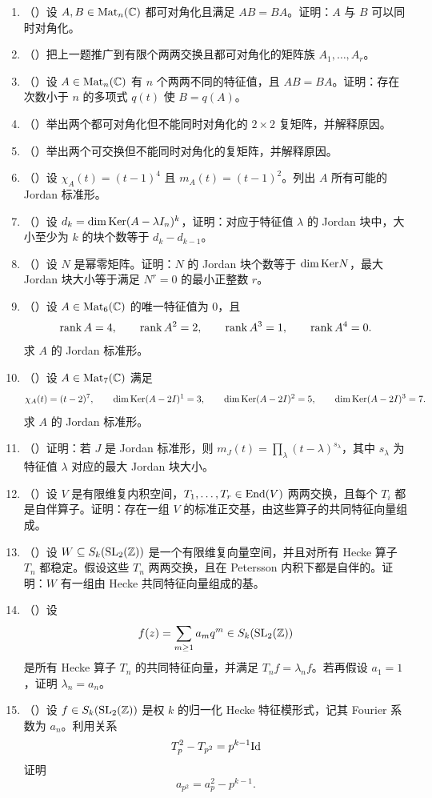 \begin{enumerate}[label=\arabic*., leftmargin=2.8em, resume]
  \item （\hard）设 \(A,B\in \mathrm{Mat}_n(\mathbb{C})\) 都可对角化且满足 \(AB=BA\)。证明：\(A\) 与 \(B\) 可以同时对角化。
  \item （\hard）把上一题推广到有限个两两交换且都可对角化的矩阵族 \(A_1,\dots,A_r\)。
  \item （\hard）设 \(A\in \mathrm{Mat}_n(\mathbb{C})\) 有 \(n\) 个两两不同的特征值，且 \(AB=BA\)。证明：存在次数小于 \(n\) 的多项式 \(q(t)\) 使 \(B=q(A)\)。
  \item （\hard）举出两个都可对角化但不能同时对角化的 \(2\times 2\) 复矩阵，并解释原因。
  \item （\hard）举出两个可交换但不能同时对角化的复矩阵，并解释原因。
  \item （\hard）设 \(\chi_A(t)=(t-1)^4\) 且 \(m_A(t)=(t-1)^2\)。列出 \(A\) 所有可能的 Jordan 标准形。
  \item （\hard）设 \(d_k=\dim\mathrm{Ker}(A-\lambda I_n)^k\)，证明：对应于特征值 \(\lambda\) 的 Jordan 块中，大小至少为 \(k\) 的块个数等于 \(d_k-d_{k-1}\)。
  \item （\hard）设 \(N\) 是幂零矩阵。证明：\(N\) 的 Jordan 块个数等于 \(\dim\mathrm{Ker} N\)，最大 Jordan 块大小等于满足 \(N^r=0\) 的最小正整数 \(r\)。
  \item （\hard）设 \(A\in \mathrm{Mat}_6(\mathbb{C})\) 的唯一特征值为 \(0\)，且
  \[
  \operatorname{rank} A=4,\qquad \operatorname{rank} A^2=2,\qquad \operatorname{rank} A^3=1,\qquad \operatorname{rank} A^4=0.
  \]
  求 \(A\) 的 Jordan 标准形。
  \item （\hard）设 \(A\in \mathrm{Mat}_7(\mathbb{C})\) 满足
  \[
  \chi_A(t)=(t-2)^7,
  \qquad \dim\mathrm{Ker}(A-2I)^1=3,
  \qquad \dim\mathrm{Ker}(A-2I)^2=5,
  \qquad \dim\mathrm{Ker}(A-2I)^3=7.
  \]
  求 \(A\) 的 Jordan 标准形。
  \item （\hard）证明：若 \(J\) 是 Jordan 标准形，则 \(m_J(t)=\prod_{\lambda}(t-\lambda)^{s_\lambda}\)，其中 \(s_\lambda\) 为特征值 \(\lambda\) 对应的最大 Jordan 块大小。
  \item （\hard）设 \(V\) 是有限维复内积空间，\(T_1,\dots,T_r\in \mathrm{End}(V)\) 两两交换，且每个 \(T_i\) 都是自伴算子。证明：存在一组 \(V\) 的标准正交基，由这些算子的共同特征向量组成。
  \item （\hard）设 \(W\subseteq S_k(\mathrm{SL}_2(\mathbb{Z}))\) 是一个有限维复向量空间，并且对所有 Hecke 算子 \(T_n\) 都稳定。假设这些 \(T_n\) 两两交换，且在 Petersson 内积下都是自伴的。证明：\(W\) 有一组由 Hecke 共同特征向量组成的基。
  \item （\hard）设
  \[
  f(z)=\sum_{m\ge 1} a_m q^m\in S_k(\mathrm{SL}_2(\mathbb{Z}))
  \]
  是所有 Hecke 算子 \(T_n\) 的共同特征向量，并满足 \(T_n f=\lambda_n f\)。若再假设 \(a_1=1\)，证明 \(\lambda_n=a_n\)。
  \item （\hard）设 \(f\in S_k(\mathrm{SL}_2(\mathbb{Z}))\) 是权 \(k\) 的归一化 Hecke 特征模形式，记其 Fourier 系数为 \(a_n\)。利用关系
  \[
  T_p^2-T_{p^2}=p^{k-1}\mathrm{Id}
  \]
  证明
  \[
  a_{p^2}=a_p^2-p^{k-1}.
  \]
\end{enumerate}
